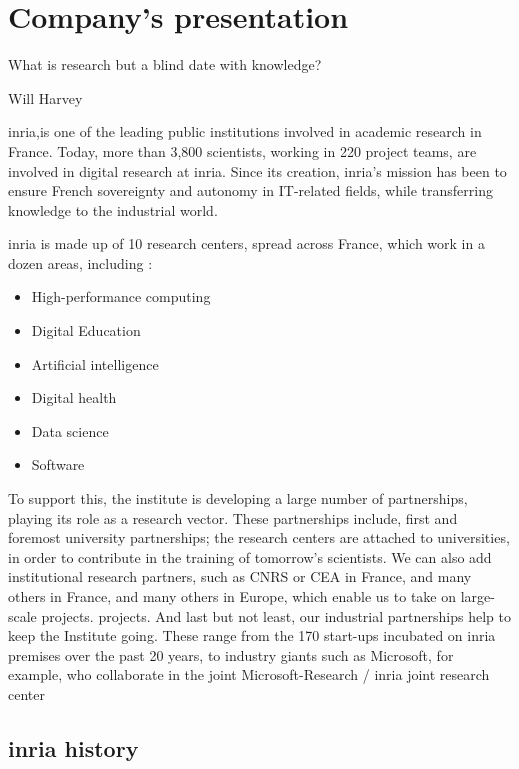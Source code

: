 \chapter{Company's presentation}
\label{chap:inria}

\epigraph{What is research but a blind date with knowledge?}{Will Harvey}
\gls{inria},is one of the leading public institutions involved in academic research in France. Today, more than 3,800 scientists, working in 220 project teams, are involved in digital research at \gls{inria}. Since its creation, \gls{inria}'s mission has been to ensure French sovereignty and autonomy in IT-related fields, while transferring knowledge to the industrial world. 

\gls{inria} is made up of 10 research centers, spread across France, which
work in a dozen areas, including :
\begin{multicols}{2}
\begin{itemize}
    \item High-performance computing
    \item Digital Education
    \item Artificial intelligence
    \item Digital health
    \item Data science
    \item Software
\end{itemize}
\end{multicols}

To support this, the institute is developing a large number of partnerships, playing its role as a research vector. These partnerships include, first and foremost university partnerships; the research centers are attached to universities, in order to contribute in the training of tomorrow's scientists. We can also add institutional research partners, such as CNRS or CEA in France, and many others in France, and many others in Europe, which enable us to take on large-scale projects. projects. And last but not least, our industrial partnerships help to keep the Institute going. These range from the 170 start-ups incubated on \gls{inria} premises over the past 20 years, to industry giants such as Microsoft, for example, who collaborate in the joint Microsoft-Research / \gls{inria} joint research center\cite{inria_microsoft}

\section{\gls{inria} history}

